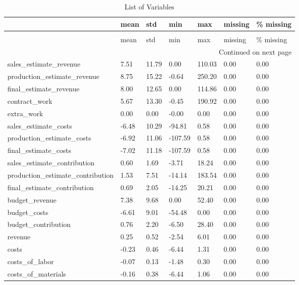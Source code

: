 \begin{landscape}\begin{longtable}[h!]{lllllll}
\caption{List of Variables} \label{eda_1} \\
\toprule
 & mean & std & min & max & missing & \% missing \\
\midrule
\endfirsthead
\caption[]{List of Variables} \\
\toprule
 & mean & std & min & max & missing & \% missing \\
\midrule
\endhead
\midrule
\multicolumn{7}{r}{Continued on next page} \\
\midrule
\endfoot
\bottomrule
\endlastfoot
sales_estimate_revenue & 7.51 & 11.79 & 0.00 & 110.03 & 0.00 & 0.00 \\
production_estimate_revenue & 8.75 & 15.22 & -0.64 & 250.20 & 0.00 & 0.00 \\
final_estimate_revenue & 8.00 & 12.65 & 0.00 & 114.86 & 0.00 & 0.00 \\
contract_work & 5.67 & 13.30 & -0.45 & 190.92 & 0.00 & 0.00 \\
extra_work & 0.00 & 0.00 & -0.00 & 0.00 & 0.00 & 0.00 \\
sales_estimate_costs & -6.48 & 10.29 & -94.81 & 0.58 & 0.00 & 0.00 \\
production_estimate_costs & -6.92 & 11.06 & -107.59 & 0.58 & 0.00 & 0.00 \\
final_estimate_costs & -7.02 & 11.18 & -107.59 & 0.58 & 0.00 & 0.00 \\
sales_estimate_contribution & 0.60 & 1.69 & -3.71 & 18.24 & 0.00 & 0.00 \\
production_estimate_contribution & 1.53 & 7.51 & -14.14 & 183.54 & 0.00 & 0.00 \\
final_estimate_contribution & 0.69 & 2.05 & -14.25 & 20.21 & 0.00 & 0.00 \\
budget_revenue & 7.38 & 9.68 & 0.00 & 52.40 & 0.00 & 0.00 \\
budget_costs & -6.61 & 9.01 & -54.48 & 0.00 & 0.00 & 0.00 \\
budget_contribution & 0.76 & 2.20 & -6.50 & 28.40 & 0.00 & 0.00 \\
revenue & 0.25 & 0.52 & -2.54 & 6.01 & 0.00 & 0.00 \\
costs & -0.23 & 0.46 & -6.44 & 1.31 & 0.00 & 0.00 \\
costs_of_labor & -0.07 & 0.13 & -1.48 & 0.30 & 0.00 & 0.00 \\
costs_of_materials & -0.16 & 0.38 & -6.44 & 1.06 & 0.00 & 0.00 \\

\end{longtable}
\end{landscape}
